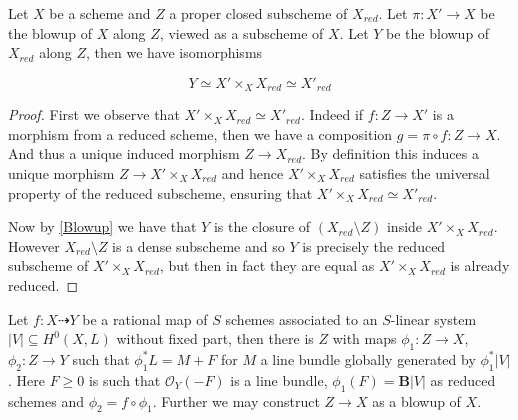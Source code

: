 \documentclass[a4paper,12pt]{book}
\newcommand{\BB}{\mathbf{B}}
\newcommand{\ox}[1][X]{\mathcal{O}_{#1}}
\begin{document}
\begin{lemma}\label{Blowup}
	
	Let $X$ be a scheme and $Z$ a proper closed subscheme of $X_{red}$. Let $\pi:X' \to X$ be the blowup of $X$ along $Z$, viewed as a subscheme of $X$. Let $Y$ be the blowup of $X_{red}$ along $Z$, then we have isomorphisms
	
	\[Y \simeq X'\times_{X} X_{red} \simeq X'_{red}\]
	
\end{lemma}
\begin{proof}
	
	First we observe that $X'\times_{X} X_{red} \simeq X'_{red}$. Indeed if $f:Z \to X'$ is a morphism from a reduced scheme, then we have a composition $g=\pi \circ f: Z \to X$. And thus a unique induced morphism $Z \to X_{red}$. By definition this induces a unique morphism $Z \to X'\times_{X} X_{red}$ and hence $X'\times_{X} X_{red}$ satisfies the universal property of the reduced subscheme, ensuring that $X'\times_{X} X_{red} \simeq X'_{red}$.
	
	Now by \autoref{Blowup} we have that $Y$ is the closure of $(X_{red}\setminus Z)$ inside $X'\times_{X} X_{red}$. However $X_{red}\setminus Z$ is a dense subscheme and so $Y$ is precisely the reduced subscheme of $X'\times_{X} X_{red}$, but then in fact they are equal as $X'\times_{X} X_{red}$ is already reduced.
	
	
\end{proof}

\begin{lemma}\label{elim}
	Let $f: X \dashrightarrow Y$ be a rational map of $S$ schemes associated to an $S$-linear system $|V|\subseteq H^{0}(X,L)$ without fixed part, then there is $Z$ with maps $\phi_{1}:Z \to X$, $\phi_{2}:Z \to Y$ such that $\phi_{1}^{*}L=M+F$ for $M$ a line bundle globally generated by $\phi_{1}^{*}|V|$. Here $F \geq 0$ is such that $\ox[Y](-F)$ is a line bundle, $\phi_{1}(F)=\BB|V|$ as reduced schemes and $\phi_{2}=f\circ \phi_{1}$. Further we may construct $Z \to X$ as a blowup of $X$.
\end{lemma}
\end{document}
